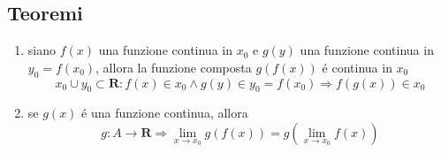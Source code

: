 \documentclass{exam}
\begin{document}
  \subsection{Teoremi}
    \begin{enumerate}
      \item
        siano $f(x)$ una funzione continua in $x_{0}$ e
        $g(y)$ una funzione continua in $y_{0}=f(x_{0})$, allora
        la funzione composta $g(f(x))$ \'e continua in $x_{0}$
        \begin{displaymath}
          x_{0}\cup y_{0}\subset \mathbf{R}:f(x) \in x_{0} \land g(y) 
          \in y_{0}=f(x_{0}) \Rightarrow f(g(x))\in x_{0}
        \end{displaymath}
      \item
        se $g(x)$ \'e una funzione continua, allora
        \begin{displaymath}
          g:A\rightarrow \mathbf{R}\Rightarrow\lim_{x\to x_{0}}g(f(x))=g(\lim_{x\to x_{0}}f(x))
        \end{displaymath}
    \end{enumerate}
\end{document}
